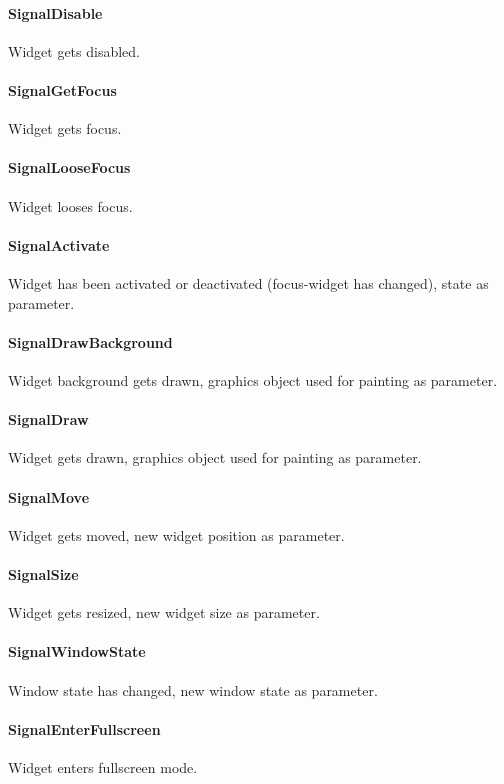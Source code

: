 \paragraph{SignalDisable}
Widget gets disabled.

\paragraph{SignalGetFocus}
Widget gets focus.

\paragraph{SignalLooseFocus}
Widget looses focus.

\paragraph{SignalActivate}
Widget has been activated or deactivated (focus-widget has changed), state as parameter.

\paragraph{SignalDrawBackground}
Widget background gets drawn, graphics object used for painting as parameter.

\paragraph{SignalDraw}
Widget gets drawn, graphics object used for painting as parameter.

\paragraph{SignalMove}
Widget gets moved, new widget position as parameter.

\paragraph{SignalSize}
Widget gets resized, new widget size as parameter.

\paragraph{SignalWindowState}
Window state has changed, new window state as parameter.

\paragraph{SignalEnterFullscreen}
Widget enters fullscreen mode.


